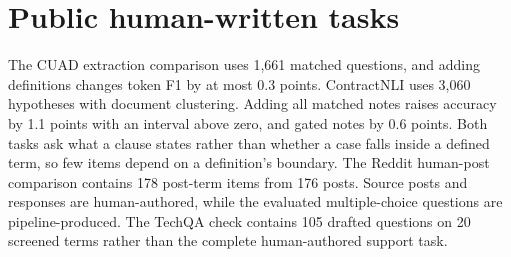 \section{Public human-written tasks}
\label{app:boundaries}

The CUAD extraction comparison uses 1,661 matched questions, and adding definitions changes token F1 by at most 0.3 points. ContractNLI \citep{contractnli} uses 3,060 hypotheses with document clustering. Adding all matched notes raises accuracy by 1.1 points with an interval above zero, and gated notes by 0.6 points. Both tasks ask what a clause states rather than whether a case falls inside a defined term, so few items depend on a definition's boundary. The Reddit human-post comparison contains 178 post-term items from 176 posts. Source posts and responses are human-authored, while the evaluated multiple-choice questions are pipeline-produced. The TechQA check contains 105 drafted questions on 20 screened terms rather than the complete human-authored support task.



